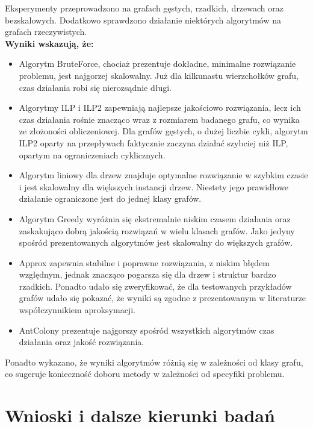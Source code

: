 Eksperymenty przeprowadzono na grafach gęstych, rzadkich, drzewach oraz bezskalowych. Dodatkowo sprawdzono działanie niektórych algorytmów na grafach rzeczywistych. \\
\textbf{Wyniki wskazują, że:}
\begin{itemize}
    \item Algorytm BruteForce, chociaż prezentuje dokładne, minimalne rozwiązanie problemu, jest najgorzej skalowalny. Już dla kilkunastu wierzchołków grafu, czas działania robi się nierozsądnie długi.
    \item Algorytmy ILP i ILP2 zapewniają najlepsze jakościowo rozwiązania, lecz ich czas działania rośnie znacząco wraz z rozmiarem badanego grafu, co wynika ze złożoności obliczeniowej. Dla grafów gęstych, o dużej liczbie cykli, algorytm ILP2 oparty na przepływach faktycznie zaczyna działać szybciej niż ILP, opartym na ograniczeniach cyklicznych.
    \item Algorytm liniowy dla drzew znajduje optymalne rozwiązanie w szybkim czasie i jest skalowalny dla większych instancji drzew. Niestety jego prawidłowe działanie ograniczone jest do jednej klasy grafów.
    \item Algorytm Greedy wyróżnia się ekstremalnie niskim czasem działania oraz zaskakująco dobrą jakością rozwiązań w wielu klasach grafów. Jako jedyny spośród prezentowanych algorytmów jest skalowalny do większych grafów.
    \item Approx zapewnia stabilne i poprawne rozwiązania, z niskim błędem względnym, jednak znacząco pogarsza się dla drzew i struktur bardzo rzadkich. Ponadto udało się zweryfikować, że dla testowanych przykładów grafów udało się pokazać, że wyniki są zgodne z prezentowanym w literaturze współczynnikiem aproksymacji.
    \item AntColony prezentuje najgorszy spośród wszystkich algorytmów czas działania oraz jakość rozwiązania.
\end{itemize}

Ponadto wykazano, że wyniki algorytmów różnią się w zależności od klasy grafu, co sugeruje konieczność doboru metody w zależności od specyfiki problemu.

\section{Wnioski i dalsze kierunki badań}

